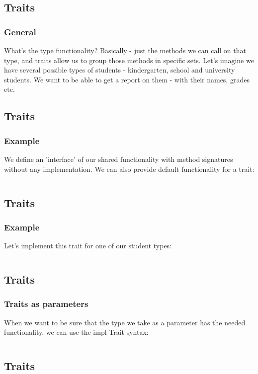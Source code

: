 \documentclass[usenames,twocolumn,dvipsnames,10pt,a4wide]{article}
\begin{document}
\subsection{Traits}
	\subsubsection{General}
	What's the type functionality? Basically - just the
	methods we can call on that type, and traits
	allow us to group those methods in specific sets.
	Let's imagine we have several possible types of
	students - kindergarten, school and university
	students. We want to be able to get a report on
	them - with their names, grades etc.


\subsection{Traits}
	\subsubsection{Example}
	We define an 'interface' of our shared functionality
	with method signatures without any implementation.
	We can also provide default functionality for a trait:
	\inputminted[fontsize=\normalsize]{rust}{code/traits1.rs}


\subsection{Traits}
	\subsubsection{Example}
	Let's implement this trait for one of our student types:
	\inputminted[fontsize=\normalsize]{rust}{code/traits2.rs}


\subsection{Traits}
	\subsubsection{Traits as parameters}
	When we want to be sure that the type we take as a parameter
	has the needed functionality, we can use the impl Trait syntax:
	\inputminted[fontsize=\normalsize]{rust}{code/traits3.rs}


\subsection{Traits}
\end{document}
